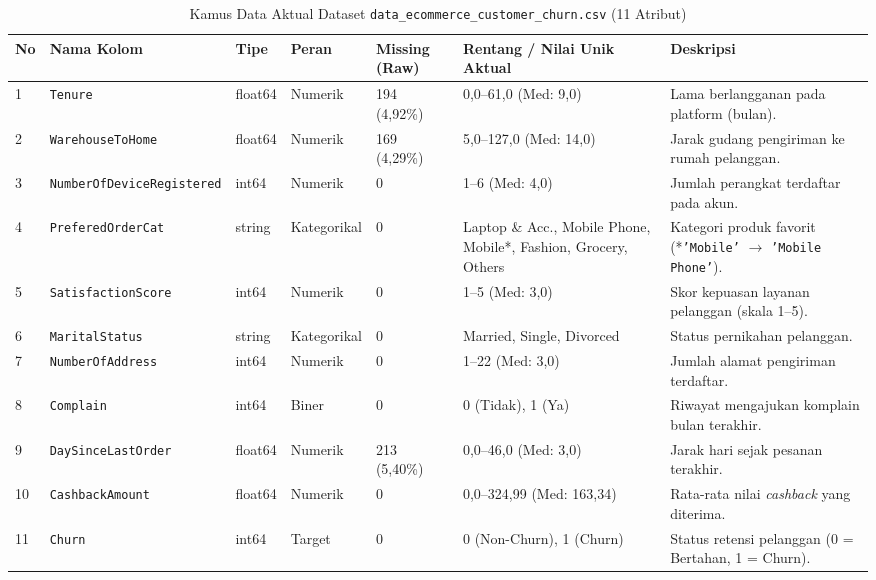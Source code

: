 \documentclass[11pt,a4paper]{article}
\DeclareRobustCommand{\code}[1]{\texttt{\textcolor{CodeColor}{#1}}}
\newcommand{\thdr}[1]{\textbf{#1}}
\begin{document}
\begin{table}[H]
  \centering
  \caption{Kamus Data Aktual Dataset \code{data\_ecommerce\_customer\_churn.csv} (11 Atribut)}
  \label{tab:kamus_data}
  \renewcommand{\arraystretch}{1.22}
  \setlength{\tabcolsep}{3pt}
  \scriptsize
  \begin{tabularx}{\textwidth}{@{}M{0.5cm} P{3.4cm} M{1.0cm} M{1.4cm} M{1.5cm} P{2.3cm} L@{}}
    \toprule
    \thdr{No} & \thdr{Nama Kolom} & \thdr{Tipe} & \thdr{Peran} & \thdr{Missing (Raw)} & \thdr{Rentang / Nilai Unik Aktual} & \thdr{Deskripsi} \\
     & \code{Tenure} & float64 & Numerik & 194 (4,92\%) & 0,0--61,0 (Med: 9,0) & Lama berlangganan pada platform (bulan). \\
    2 & \code{WarehouseToHome} & float64 & Numerik & 169 (4,29\%) & 5,0--127,0 (Med: 14,0) & Jarak gudang pengiriman ke rumah pelanggan. \\
    3 & \code{NumberOfDeviceRegistered} & int64 & Numerik & 0 & 1--6 (Med: 4,0) & Jumlah perangkat terdaftar pada akun. \\
    4 & \code{PreferedOrderCat} & string & Kategorikal & 0 & Laptop \& Acc., Mobile Phone, Mobile*, Fashion, Grocery, Others & Kategori produk favorit (*\code{'Mobile'} $\rightarrow$ \code{'Mobile Phone'}). \\
    5 & \code{SatisfactionScore} & int64 & Numerik & 0 & 1--5 (Med: 3,0) & Skor kepuasan layanan pelanggan (skala 1--5). \\
    6 & \code{MaritalStatus} & string & Kategorikal & 0 & Married, Single, Divorced & Status pernikahan pelanggan. \\
    7 & \code{NumberOfAddress} & int64 & Numerik & 0 & 1--22 (Med: 3,0) & Jumlah alamat pengiriman terdaftar. \\
    8 & \code{Complain} & int64 & Biner & 0 & 0 (Tidak), 1 (Ya) & Riwayat mengajukan komplain bulan terakhir. \\
    9 & \code{DaySinceLastOrder} & float64 & Numerik & 213 (5,40\%) & 0,0--46,0 (Med: 3,0) & Jarak hari sejak pesanan terakhir. \\
    10 & \code{CashbackAmount} & float64 & Numerik & 0 & 0,0--324,99 (Med: 163,34) & Rata-rata nilai \textit{cashback} yang diterima. \\
    11 & \code{Churn} & int64 & Target & 0 & 0 (Non-Churn), 1 (Churn) & Status retensi pelanggan (0 = Bertahan, 1 = Churn). \\
    \bottomrule
  \end{tabularx}
\end{table}
\end{document}
